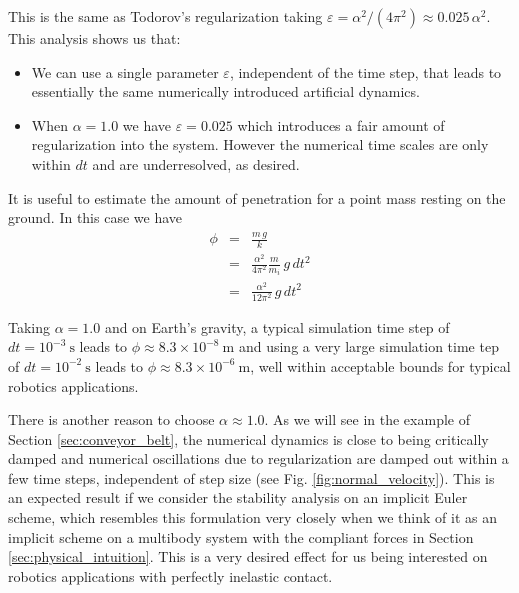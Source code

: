 This is the same as Todorov's regularization taking $\varepsilon =
\alpha^2/(4\pi^2)\approx 0.025\,\alpha^2$. This analysis shows us that:
\begin{itemize}
	\item We can use a single parameter $\varepsilon$, independent of the time
	step, that leads to essentially the same numerically introduced artificial
	dynamics. 
	\item When $\alpha=1.0$ we have $\varepsilon=0.025$ which introduces a fair
	amount of regularization into the system. However the numerical time scales
	are only within $dt$ and are underresolved, as desired.
\end{itemize}

It is useful to estimate the amount of penetration for a point mass resting on
the ground. In this case we have
\begin{eqnarray}
	\phi &=& \frac{m\,g}{k} \nonumber\\
	&=& \frac{\alpha^2}{4\pi^2}\frac{m}{m_i}\,g\,dt^2\nonumber\\
	&=& \frac{\alpha^2}{12\pi^2}\,g\,dt^2
\end{eqnarray}

Taking $\alpha=1.0$ and on Earth's gravity, a typical simulation time step of
$dt=10^{-3}~\text{s}$ leads to $\phi\approx 8.3\times 10^{-8}~\text{m}$ and
using a very large simulation time tep of $dt=10^{-2}~\text{s}$ leads to
$\phi\approx 8.3\times 10^{-6}~\text{m}$, well within acceptable bounds for
typical robotics applications.

There is another reason to choose $\alpha\approx 1.0$. As we will see in the
example of Section \ref{sec:conveyor_belt}, the numerical dynamics is close to
being critically damped and numerical oscillations due to regularization are
damped out within a few time steps, independent of step size (see Fig.
\ref{fig:normal_velocity}). This is an expected result if we consider the
stability analysis on an implicit Euler scheme, which resembles this formulation
very closely when we think of it as an implicit scheme on a multibody system
with the compliant forces  in Section \ref{sec:physical_intuition}. This is a
very desired effect for us being interested on robotics applications with
perfectly inelastic contact.

